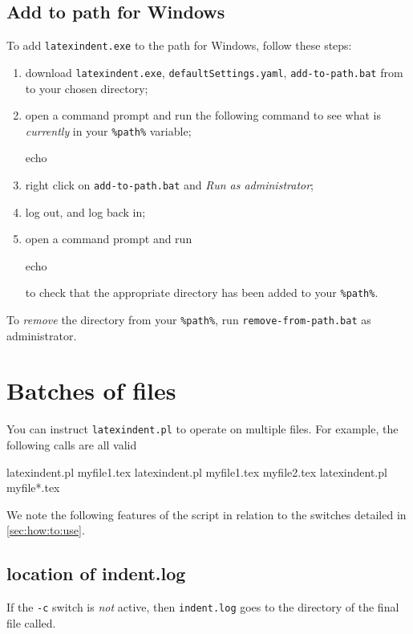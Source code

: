  \subsection{Add to path for Windows}
  To add \texttt{latexindent.exe} to the path for Windows, follow these steps:
  \begin{enumerate}
   \item download \texttt{latexindent.exe}, \texttt{defaultSettings.yaml},
         \texttt{add-to-path.bat} from \cite{latexindent-home} to your chosen directory;
   \item open a command prompt and run the following command to see what is
         \emph{currently} in your \lstinline!%path%! variable;
         \begin{dosprompt}
echo %
          \end{dosprompt}
   \item right click on \texttt{add-to-path.bat} and \emph{Run as administrator};
   \item log out, and log back in;
   \item open a command prompt and run
         \begin{dosprompt}
echo %
          \end{dosprompt}
         to check that the appropriate directory has been added to your
         \lstinline!%path%!.
  \end{enumerate}
  To \emph{remove} the directory from your \lstinline!%path%!, run
  \texttt{remove-from-path.bat} as administrator.

 \section{Batches of files}\label{sec:batches}

  You can  instruct
  \texttt{latexindent.pl} to operate on multiple files. For example, the following calls
  are all valid

  \begin{commandshell}
latexindent.pl myfile1.tex
latexindent.pl myfile1.tex myfile2.tex
latexindent.pl myfile*.tex
        \end{commandshell}

  We note the following features of the script in relation to the switches detailed in
  \cref{sec:how:to:use}.

 \subsection{location of indent.log}
  If the \texttt{-c} switch is \emph{not} active, then \texttt{indent.log} goes to the directory of the final file called.

